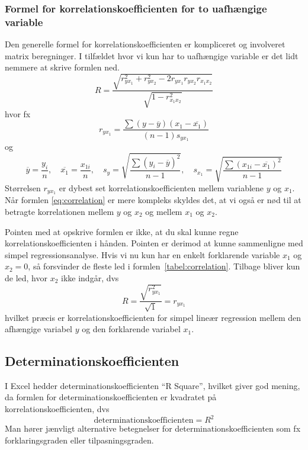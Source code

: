 \subsubsection{Formel for korrelationskoefficienten for to uafhængige variable}
Den generelle formel for korrelationskoefficienten er kompliceret og involveret matrix beregninger. I tilfældet hvor vi kun har to uafhængige variable er det lidt nemmere at skrive formlen ned.
\begin{displaymath}\label{eq:correlation}
  R = \frac{\sqrt{r^2_{yx_1} + r^2_{yx_2} - 2r_{yx_1} r_{yx_2} r_{{x_1}x_2}}}{\sqrt{1 - r^2_{{x_1}x_2}}}
\end{displaymath}
hvor fx
\begin{displaymath}
  r_{{y}{x_1}} = \frac{\sum{(y - \overbar{y})(x_1 - \overbar{x_1})}}{(n-1)s_{{y}{x_1}}}
\end{displaymath}
og
\begin{displaymath}
  \overbar{y} = \frac{y_{i}}{n}, \quad \overbar{x_1} = \frac{x_{1i}}{n}, \quad s_{y} = \sqrt{\frac{\sum{(y_{i} - \overbar{y})^2}}{n-1}}, \quad s_{x_1} = \sqrt{\frac{\sum{(x_{1i} - \overbar{x_1})^2}}{n-1}}
\end{displaymath}
Størrelsen \(r_{{y}{x_1}}\) er dybest set korrelationskoefficienten mellem variablene \(y\) og \(x_1\). Når formlen \ref{eq:correlation} er mere kompleks skyldes det, at vi også er nød til at betragte korrelationen mellem \(y\) og \(x_2\) og mellem \(x_1\) og \(x_2\).

Pointen med at opskrive formlen er ikke, at du skal kunne regne korrelationskoefficienten i hånden. Pointen er derimod at kunne sammenligne med simpel regressionsanalyse. Hvis vi nu kun har en enkelt forklarende variable \(x_1\) og \(x_2=0\), så forsvinder de fleste led i formlen~\ref{tabel:correlation}. Tilbage bliver kun de led, hvor \(x_2\) ikke indgår, dvs
\begin{displaymath}
  R = \frac{\sqrt{r^2_{yx_1}}}{\sqrt{1}} = r_{yx_1}
\end{displaymath}
hvilket præcis er korrelationskoefficienten for simpel lineær regression mellem den afhængige variabel \(y\) og den forklarende variabel \(x_1\).

\subsection{Determinationskoefficienten}
I Excel hedder determinationskoefficienten ``R Square'', hvilket giver god mening, da formlen for determinationskoefficienten er kvadratet på korrelationskoefficienten, dvs
\begin{displaymath}
\mathrm{determinationskoefficienten} = R^2
\end{displaymath}
Man hører jænvligt alternative betegnelser for determinationskoefficienten som fx for\-kla\-rings\-grad\-en eller tilpasningsgraden.

